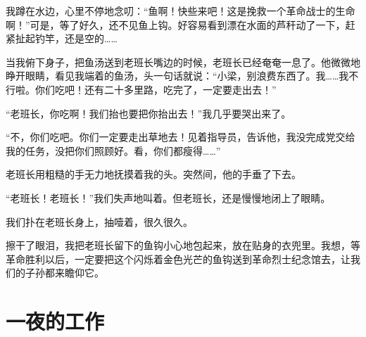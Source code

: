 \documentclass[12pt,UTF-8,openany]{ctexbook}
\begin{document}
\begin{large}
    我蹲在水边，心里不停地念叨：“鱼啊！快些来吧！这是挽救一个革命战士的生命啊！”可是，等了好久，还不见鱼上钩。好容易看到漂在水面的芦秆动了一下，赶紧扯起钓竿，还是空的……
    
    当我俯下身子，把鱼汤送到老班长嘴边的时候，老班长已经奄奄一息了。他微微地睁开眼睛，看见我端着的鱼汤，头一句话就说：“小梁，别浪费东西了。我……我不行啦。你们吃吧！还有二十多里路，吃完了，一定要走出去！”
    
    “老班长，你吃啊！我们抬也要把你抬出去！”我几乎要哭出来了。
    
    “不，你们吃吧。你们一定要走出草地去！见着指导员，告诉他，我没完成党交给我的任务，没把你们照顾好。看，你们都瘦得……”
    
    老班长用粗糙的手无力地抚摸着我的头。突然间，他的手垂了下去。
    
    “老班长！老班长！”我们失声地叫着。但老班长，还是慢慢地闭上了眼睛。
    
    我们扑在老班长身上，抽噎着，很久很久。
    
    擦干了眼泪，我把老班长留下的鱼钩小心地包起来，放在贴身的衣兜里。我想，等革命胜利以后，一定要把这个闪烁着金色光芒的鱼钩送到革命烈士纪念馆去，让我们的子孙都来瞻仰它。
    
\end{large}



\chapter{一夜的工作}
\end{document}

